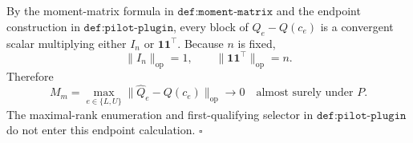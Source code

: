 By the moment-matrix formula in \(\texttt{def:moment-matrix}\) and the endpoint construction in \(\texttt{def:pilot-plugin}\), every block of \(\widehat Q_e-Q(c_e)\) is a convergent scalar multiplying either \(I_n\) or \(\mathbf1\mathbf1^{\top}\).  Because \(n\) is fixed,
\[
\lVert I_n\rVert_{\mathrm{op}}=1,
\qquad
\lVert\mathbf1\mathbf1^{\top}\rVert_{\mathrm{op}}=n.
\tag{9}
\]
Therefore
\[
M_m=\max_{e\in\{L,U\}}
\lVert\widehat Q_e-Q(c_e)\rVert_{\mathrm{op}}
\longrightarrow0
\quad\text{almost surely under }P.
\tag{10}
\]
The maximal-rank enumeration and first-qualifying selector in \(\texttt{def:pilot-plugin}\) do not enter this endpoint calculation. \(\square\)
